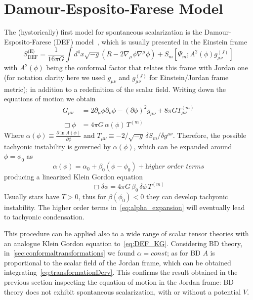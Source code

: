 \section{Damour-Esposito-Farese Model}
The (hystorically) first model for spontaneous scalarization is the Damour-Esposito-Farese (DEF) model~\cite{Esposito-Farese:1993gds}, which is usually presented in the Einstein frame
\begin{equation}\label{eq:DEFAction}
    S_{\text{DEF}}^{\text{(E)}} = \frac{1}{16\pi G} \int d^4x \sqrt{-g} \left( R - 2 \nabla_\mu \phi \nabla^\mu \phi \right) 
    + S_m [\Psi_m; A^2(\phi) g^{(J)}_{\mu\nu}]
\end{equation}
with $A^2(\phi)$ being the conformal factor that relates this frame with Jordan one (for notation clarity here we used $g_{\mu\nu}$ and $g^{(J)}_{\mu\nu}$ for Einstein/Jordan frame metric); in addition to a redefinition of the scalar field. Writing down the equations of motion we obtain~\cite{Esposito-Farese:1993gds}
\begin{align}
    G_{\mu\nu} &= 2\partial_\mu \phi \partial_\nu \phi - \left(\partial \phi\right)^2 g_{\mu\nu}+ 8\pi G T_{\mu\nu}^{(m)} \\[6pt]
    \Box \phi &= 4\pi G \,\alpha(\phi)\, T^{(m)} \label{eq:DEF_KG}
\end{align}
Where $\alpha(\phi)\equiv \frac{\partial \ln{A(\phi)}}{\partial \phi}$ and $T_{\mu\nu} \equiv -2/\sqrt{-g} \, \delta S_m/\delta g^{\mu\nu}$.
Therefore, the possible tachyonic instability is governed by $\alpha(\phi)$, which can be expanded around $\phi = \phi_0$ as
\begin{equation}\label{eq:alpha_expansion}
    \alpha(\phi) = \alpha_0 + \beta_0 \left(\phi-\phi_0\right) + \textit{higher order terms}
\end{equation} 
producing a linearized Klein Gordon equation
\begin{equation}\label{eq:DEF_KG_linearized}
    \Box \delta \phi = 4\pi G \, \beta_0\, \delta \phi \, T^{(m)}
\end{equation}
Usually stars have $T>0$, thus for $\beta(\phi_0) <0$ they can develop tachyonic instability. The higher order terms in~\eqref{eq:alpha_expansion} will eventually lead to tachyonic condensation.

This procedure can be applied also to a wide range of scalar tensor theories with an analogue Klein Gordon equation to~\eqref{eq:DEF_KG}. Considering BD theory, in~\ref{sec:conformaltransformations} we found $\alpha = \textit{const}$; 
as for BD $A$ is proportional to the scalar field of the Jordan frame, which can be obtained integrating~\eqref{eq:transformationDerv}. This confirms the result obtained in the previous section inspecting the equation of motion in the Jordan frame: BD theory does not exhibit spontaneous scalarization, with or without a potential $V$.

